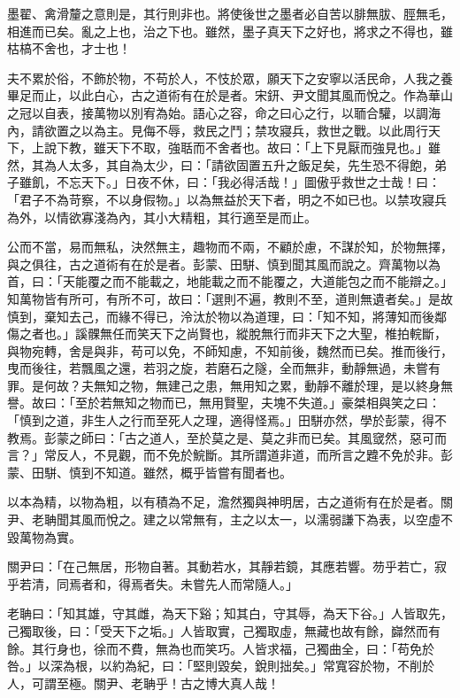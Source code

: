 \begin{pinyinscope}
墨翟、禽滑釐之意則是，其行則非也。將使後世之墨者必自苦以腓無胈、脛無毛，相進而已矣。亂之上也，治之下也。雖然，墨子真天下之好也，將求之不得也，雖枯槁不舍也，才士也！

夫不累於俗，不飾於物，不苟於人，不忮於眾，願天下之安寧以活民命，人我之養畢足而止，以此白心，古之道術有在於是者。宋鈃、尹文聞其風而悅之。作為華山之冠以自表，接萬物以別宥為始。語心之容，命之曰心之行，以聏合驩，以調海內，請欲置之以為主。見侮不辱，救民之鬥；禁攻寢兵，救世之戰。以此周行天下，上說下教，雖天下不取，強聒而不舍者也。故曰：「上下見厭而強見也。」雖然，其為人太多，其自為太少，曰：「請欲固置五升之飯足矣，先生恐不得飽，弟子雖飢，不忘天下。」日夜不休，曰：「我必得活哉！」圖傲乎救世之士哉！曰：「君子不為苛察，不以身假物。」以為無益於天下者，明之不如已也。以禁攻寢兵為外，以情欲寡淺為內，其小大精粗，其行適至是而止。

公而不當，易而無私，決然無主，趣物而不兩，不顧於慮，不謀於知，於物無擇，與之俱往，古之道術有在於是者。彭蒙、田駢、慎到聞其風而說之。齊萬物以為首，曰：「天能覆之而不能載之，地能載之而不能覆之，大道能包之而不能辯之。」知萬物皆有所可，有所不可，故曰：「選則不遍，教則不至，道則無遺者矣。」是故慎到，棄知去己，而緣不得已，泠汰於物以為道理，曰：「知不知，將薄知而後鄰傷之者也。」謑髁無任而笑天下之尚賢也，縱脫無行而非天下之大聖，椎拍輐斷，與物宛轉，舍是與非，苟可以免，不師知慮，不知前後，魏然而已矣。推而後行，曳而後往，若飄風之還，若羽之旋，若磨石之隧，全而無非，動靜無過，未嘗有罪。是何故？夫無知之物，無建己之患，無用知之累，動靜不離於理，是以終身無譽。故曰：「至於若無知之物而已，無用賢聖，夫塊不失道。」豪桀相與笑之曰：「慎到之道，非生人之行而至死人之理，適得怪焉。」田駢亦然，學於彭蒙，得不教焉。彭蒙之師曰：「古之道人，至於莫之是、莫之非而已矣。其風窢然，惡可而言？」常反人，不見觀，而不免於鯇斷。其所謂道非道，而所言之韙不免於非。彭蒙、田駢、慎到不知道。雖然，概乎皆嘗有聞者也。

以本為精，以物為粗，以有積為不足，澹然獨與神明居，古之道術有在於是者。關尹、老聃聞其風而悅之。建之以常無有，主之以太一，以濡弱謙下為表，以空虛不毀萬物為實。

關尹曰：「在己無居，形物自著。其動若水，其靜若鏡，其應若響。芴乎若亡，寂乎若清，同焉者和，得焉者失。未嘗先人而常隨人。」

老聃曰：「知其雄，守其雌，為天下谿；知其白，守其辱，為天下谷。」人皆取先，己獨取後，曰：「受天下之垢。」人皆取實，己獨取虛，無藏也故有餘，巋然而有餘。其行身也，徐而不費，無為也而笑巧。人皆求福，己獨曲全，曰：「苟免於咎。」以深為根，以約為紀，曰：「堅則毀矣，銳則拙矣。」常寬容於物，不削於人，可謂至極。關尹、老聃乎！古之博大真人哉！


\end{pinyinscope}
